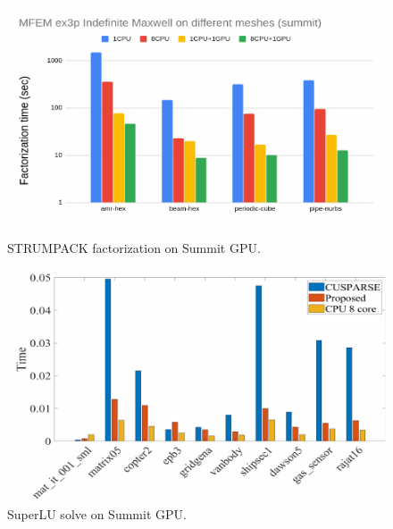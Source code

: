\vspace{-.3in}
\begin{figure}[htb]
\begin{minipage}[t]{0.48\columnwidth}
\centering
\includegraphics[scale=0.7]{projects/2.3.3-MathLibs/2.3.3.07-STRUMPACK-SuperLU/strumpack-Summit.pdf}
\caption{STRUMPACK factorization on Summit GPU.}
\label{fig:strumpack-parmetis-scaling}
\end{minipage}
\begin{minipage}[t]{0.48\columnwidth}
\centering
\includegraphics[scale=0.8]{projects/2.3.3-MathLibs/2.3.3.07-STRUMPACK-SuperLU/superlu-solve-Summit.pdf}
\caption{SuperLU solve on Summit GPU.}
\label{fig:strumpack-metis-scaling}
\end{minipage}
\end{figure}


